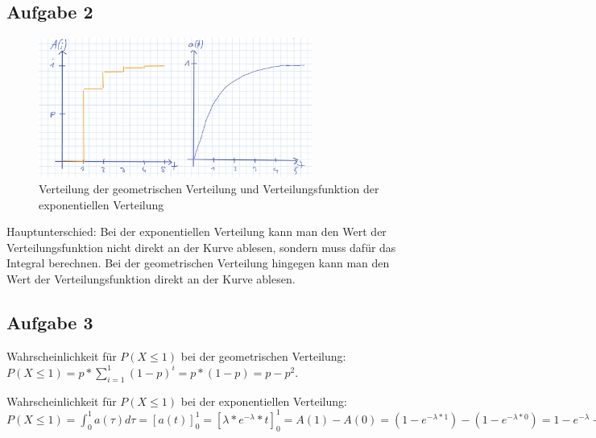 \documentclass[%
10pt,              %
ngerman,           %
a4paper,           %
DIV11,             %
]{scrartcl}%
\begin{document}
\subsection*{Aufgabe 2}
     
\begin{figure}[!htbp]
  \centering
    \caption{Verteilung der geometrischen Verteilung und Verteilungsfunktion der exponentiellen Verteilung}
    \includegraphics[width=0.8\textwidth]{a4vertfkt}
\end{figure}
Hauptunterschied: Bei der exponentiellen Verteilung kann man den Wert der Verteilungsfunktion nicht direkt an der Kurve ablesen, sondern muss dafür das Integral berechnen. Bei der geometrischen Verteilung hingegen kann man den Wert der Verteilungsfunktion direkt an der Kurve ablesen. 

\subsection*{Aufgabe 3}

Wahrscheinlichkeit für $P(X \leq 1)$ bei der geometrischen Verteilung:\newline
$P(X \leq 1) = p * \sum_{i = 1}^{1} (1-p)^i = p * (1-p) = p - p^2$.\newline

Wahrscheinlichkeit für $P(X \leq 1)$ bei der exponentiellen Verteilung:\newline
$P(X \leq 1) = \int_{0}^{1} a(\tau) d\tau = [a(t)]_0^1 = [\lambda * e^{-\lambda} * t]_0^1 = A(1) - A(0) = (1 - e^{-\lambda * 1}) - (1 - e^{-\lambda * 0}) = 1 - e^{-\lambda} - 1 + 1 = 1 - e^{- \lambda}$ 
\end{document}
